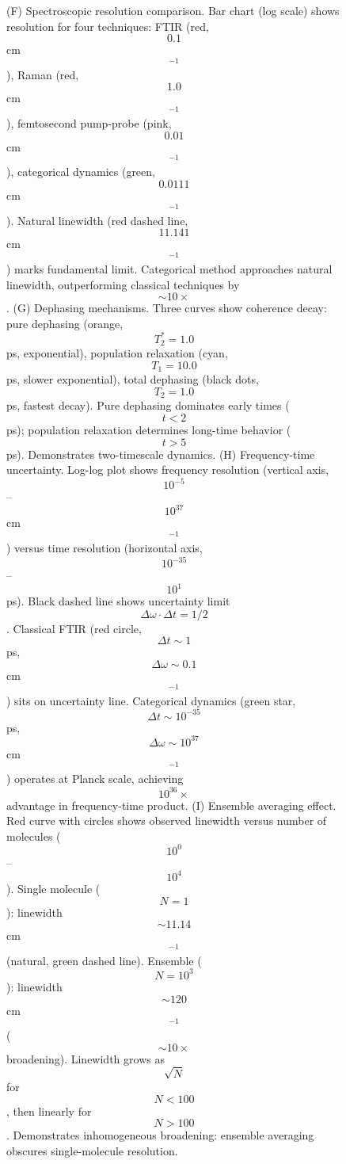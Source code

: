 \begin{figure}[htbp]
{                            (F) Spectroscopic resolution comparison. Bar chart (log scale) shows resolution for four techniques: FTIR (red, $$0.1$$ cm$$^{-1}$$), Raman (red, $$1.0$$ cm$$^{-1}$$), femtosecond pump-probe (pink, $$0.01$$ cm$$^{-1}$$), categorical dynamics (green, $$0.0111$$ cm$$^{-1}$$). Natural linewidth (red dashed line, $$11.141$$ cm$$^{-1}$$) marks fundamental limit. Categorical method approaches natural linewidth, outperforming classical techniques by $$\sim 10\times$$. 
                            (G) Dephasing mechanisms. Three curves show coherence decay: pure dephasing (orange, $$T_2^* = 1.0$$ ps, exponential), population relaxation (cyan, $$T_1 = 10.0$$ ps, slower exponential), total dephasing (black dots, $$T_2 = 1.0$$ ps, fastest decay). Pure dephasing dominates early times ($$t < 2$$ ps); population relaxation determines long-time behavior ($$t > 5$$ ps). Demonstrates two-timescale dynamics. 
                            (H) Frequency-time uncertainty. Log-log plot shows frequency resolution (vertical axis, $$10^{-5}$$--$$10^{37}$$ cm$$^{-1}$$) versus time resolution (horizontal axis, $$10^{-35}$$--$$10^1$$ ps). Black dashed line shows uncertainty limit $$\Delta\omega \cdot \Delta t = 1/2$$. Classical FTIR (red circle, $$\Delta t \sim 1$$ ps, $$\Delta\omega \sim 0.1$$ cm$$^{-1}$$) sits on uncertainty line. Categorical dynamics (green star, $$\Delta t \sim 10^{-35}$$ ps, $$\Delta\omega \sim 10^{37}$$ cm$$^{-1}$$) operates at Planck scale, achieving $$10^{36}\times$$ advantage in frequency-time product. 
                            (I) Ensemble averaging effect. Red curve with circles shows observed linewidth versus number of molecules ($$10^0$$--$$10^4$$). Single molecule ($$N=1$$): linewidth $$\sim 11.14$$ cm$$^{-1}$$ (natural, green dashed line). Ensemble ($$N=10^3$$): linewidth $$\sim 120$$ cm$$^{-1}$$ ($$\sim 10\times$$ broadening). Linewidth grows as $$\sqrt{N}$$ for $$N < 100$$, then linearly for $$N > 100$$. Demonstrates inhomogeneous broadening: ensemble averaging obscures single-molecule resolution.}
                            \label{fig:molecular_vibration_analysis}
                            \end{figure}

